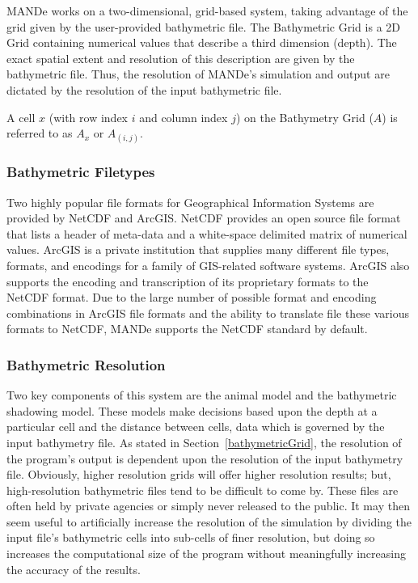 MANDe works on a two-dimensional, grid-based system, taking advantage of the grid given by the user-provided bathymetric file.  The Bathymetric Grid is a 2D Grid containing numerical values that describe a third dimension (depth).  The exact spatial extent and resolution of this description are given by the bathymetric file.  Thus, the resolution of MANDe's simulation and output are dictated by the resolution of the input bathymetric file. 

A cell $x$ (with row index $i$ and column index $j$) on the Bathymetry Grid ($A$) is referred to as $A_x$ or $A_{(i,j)}$.

\subsubsection{Bathymetric Filetypes}
\label{bathymetricFiletypes}
Two highly popular file formats for Geographical Information Systems are provided by NetCDF and ArcGIS.  NetCDF provides an open source file format that lists a header of meta-data and a white-space delimited matrix of numerical values.  ArcGIS is a private institution that supplies many different file types, formats, and encodings for a family of GIS-related software systems.  ArcGIS also supports the encoding and transcription of its proprietary formats to the NetCDF format.  Due to the large number of possible format and encoding combinations in ArcGIS file formats and the ability to translate file these various formats to NetCDF, MANDe supports the NetCDF standard by default.


\subsubsection{Bathymetric Resolution}
Two key components of this system are the animal model and the bathymetric shadowing model.  These models make decisions based upon the depth at a particular cell and the distance between cells, data which is governed by the input bathymetry file.  As stated in Section~\ref{bathymetricGrid}, the resolution of the program's output is dependent upon the resolution of the input bathymetry file.  Obviously, higher resolution grids will offer higher resolution results; but, high-resolution bathymetric files tend to be difficult to come by.  These files are often held by private agencies or simply never released to the public.  It may then seem useful to artificially increase the resolution of the simulation by dividing the input file's bathymetric cells into sub-cells of finer resolution, but doing so increases the computational size of the program without meaningfully increasing the accuracy of the results.    
 

